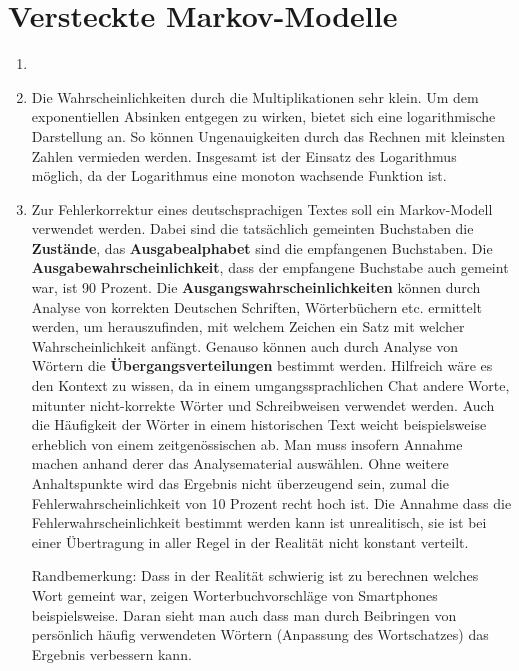 \documentclass[a4paper,10pt]{scrartcl}
\begin{document}
\section{Versteckte Markov-Modelle}
\begin{enumerate}
 \item 
 \item
  Die Wahrscheinlichkeiten durch die Multiplikationen sehr klein. Um dem exponentiellen Absinken entgegen zu wirken, bietet sich eine logarithmische
  Darstellung an. So können Ungenauigkeiten durch das Rechnen mit kleinsten Zahlen vermieden werden. Insgesamt ist der Einsatz des Logarithmus möglich, da der Logarithmus eine monoton wachsende Funktion ist.
 \item
  Zur Fehlerkorrektur eines deutschsprachigen Textes soll ein Markov-Modell verwendet werden. Dabei sind die tatsächlich gemeinten Buchstaben die \textbf{Zustände}, das \textbf{Ausgabealphabet} sind die
  empfangenen Buchstaben. Die \textbf{Ausgabewahrscheinlichkeit}, dass der empfangene Buchstabe auch gemeint war, ist 90 Prozent. Die \textbf{Ausgangswahrscheinlichkeiten} können durch Analyse von korrekten Deutschen Schriften,
  Wörterbüchern etc. ermittelt werden, um herauszufinden, mit welchem Zeichen ein Satz mit welcher Wahrscheinlichkeit anfängt. Genauso können auch durch Analyse von Wörtern die \textbf{Übergangsverteilungen} bestimmt werden.
  Hilfreich wäre es den Kontext zu wissen, da in einem umgangssprachlichen Chat andere Worte, mitunter nicht-korrekte Wörter und Schreibweisen verwendet werden. Auch die Häufigkeit der Wörter in einem
 historischen Text weicht beispielsweise erheblich von einem zeitgenössischen ab.  Man muss insofern Annahme machen anhand derer das Analysematerial auswählen. Ohne weitere Anhaltspunkte wird das Ergebnis
 nicht überzeugend sein, zumal die Fehlerwahrscheinlichkeit von 10 Prozent recht hoch ist. Die Annahme dass die Fehlerwahrscheinlichkeit bestimmt werden kann ist unrealitisch, sie ist bei einer 
 Übertragung in aller Regel in der Realität nicht konstant verteilt.

Randbemerkung: Dass in der Realität schwierig ist zu berechnen welches Wort gemeint war, zeigen Worterbuchvorschläge von Smartphones beispielsweise. Daran sieht man auch dass man durch Beibringen von
persönlich häufig verwendeten Wörtern (Anpassung des Wortschatzes) das Ergebnis verbessern kann.
\end{enumerate}
\end{document}
